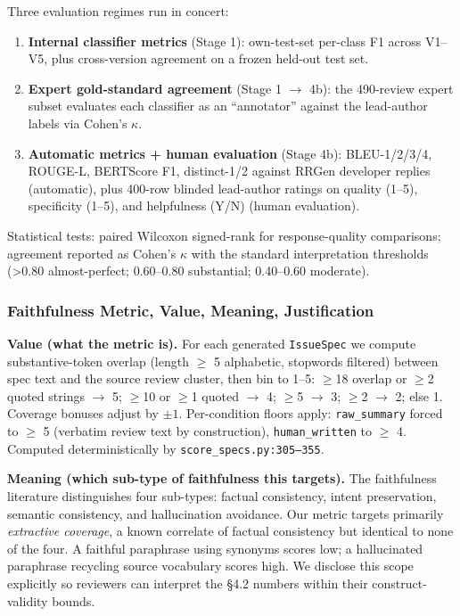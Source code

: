 \documentclass[sigconf, nonacm, anonymous, balance=false]{acmart}
\providecommand{\tightlist}{\setlength{\itemsep}{0pt}\setlength{\parskip}{0pt}}
\begin{document}
Three evaluation regimes run in concert:

\begin{enumerate}
\def\labelenumi{\arabic{enumi}.}
\tightlist
\item
  \textbf{Internal classifier metrics} (Stage 1): own-test-set per-class F1 across V1--V5, plus cross-version agreement on a frozen held-out test set.
\item
  \textbf{Expert gold-standard agreement} (Stage 1 $\rightarrow$ 4b): the 490-review expert subset evaluates each classifier as an ``annotator'' against the lead-author labels via Cohen's $\kappa$.
\item
  \textbf{Automatic metrics + human evaluation} (Stage 4b): BLEU-1/2/3/4, ROUGE-L, BERTScore F1, distinct-1/2 against RRGen developer replies (automatic), plus 400-row blinded lead-author ratings on quality (1--5), specificity (1--5), and helpfulness (Y/N) (human evaluation).
\end{enumerate}

Statistical tests: paired Wilcoxon signed-rank for response-quality comparisons; agreement reported as Cohen's $\kappa$ with the standard interpretation thresholds (\textgreater0.80 almost-perfect; 0.60--0.80 substantial; 0.40--0.60 moderate).

\subsubsection{Faithfulness Metric, Value, Meaning, Justification}\label{faithfulness-metric}

\textbf{Value (what the metric is).} For each generated \texttt{IssueSpec} we compute substantive-token overlap (length $\geq$ 5 alphabetic, stopwords filtered) between spec text and the source review cluster, then bin to 1--5: $\geq$18 overlap or $\geq$2 quoted strings $\to$ 5; $\geq$10 or $\geq$1 quoted $\to$ 4; $\geq$5 $\to$ 3; $\geq$2 $\to$ 2; else 1. Coverage bonuses adjust by $\pm 1$. Per-condition floors apply: \texttt{raw\_summary} forced to $\geq$ 5 (verbatim review text by construction), \texttt{human\_written} to $\geq$ 4. Computed deterministically by \texttt{score\_specs.py:305--355}.

\textbf{Meaning (which sub-type of faithfulness this targets).} The faithfulness literature \cite{maynez2020faithfulness, ji2023hallucination} distinguishes four sub-types: factual consistency, intent preservation, semantic consistency, and hallucination avoidance. Our metric targets primarily \emph{extractive coverage}, a known correlate of factual consistency \cite{grusky2018newsroom, maynez2020faithfulness} but identical to none of the four. A faithful paraphrase using synonyms scores low; a hallucinated paraphrase recycling source vocabulary scores high. We disclose this scope explicitly so reviewers can interpret the \S4.2 numbers within their construct-validity bounds.
\end{document}
